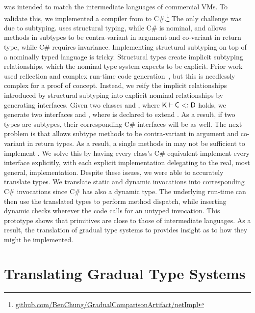 \documentclass[USenglish]{tex/lipics-v2016}
\begin{document}
\kafka was intended to match the intermediate languages of commercial VMs.
To validate this, we implemented a compiler from \kafka to
C\#.\footnote{\small\url{github.com/BenChung/GradualComparisonArtifact/netImpl}}
The only challenge was due to subtyping. \kafka uses structural typing,
while C\# is nominal, and \kafka allows methods in subtypes to be
contra-variant in argument and co-variant in return type, while C\# requires
invariance.  Implementing structural subtyping on top of a nominally typed
language is tricky. Structural types create implicit subtyping
relationships, which the nominal type system expects to be explicit.  Prior
work used reflection and complex run-time code
generation~\cite{StructuralTypesOnJVM}, but this is needlessly complex for a
proof of concept.  Instead, we reify the implicit relationships introduced
by structural subtyping into explicit nominal relationships by generating
interfaces. Given two classes \C and \D, where $\K\vdash \C \Sub \D$ holds,
we generate two interfaces  and , where  is declared to
extend . As a result, if two types are subtypes, their corresponding
C\# interfaces will be as well.  The next problem is that \kafka allows
subtype methods to be contra-variant in argument and co-variant in return
types.  As a result, a single methods in  may not be sufficient to
implement .  We solve this by having every class's C\# equivalent
implement every interface explicitly, with each explicit implementation
delegating to the real, most general, implementation.  Despite these issues,
we were able to accurately translate \kafka types. We translate static and
dynamic invocations into corresponding C\# invocations since C\# has also a
dynamic type. The underlying run-time can then use the translated \kafka
types to perform method dispatch, while inserting dynamic checks wherever
the \kafka code calls for an untyped invocation. This prototype shows that
\kafka primitives are close to those of intermediate languages. As a result,
the translation of gradual type systems to \kafka provides insight as to how
they might be implemented.

\newpage
\section{Translating Gradual Type Systems}

\vspace{-4mm}
\end{document}
